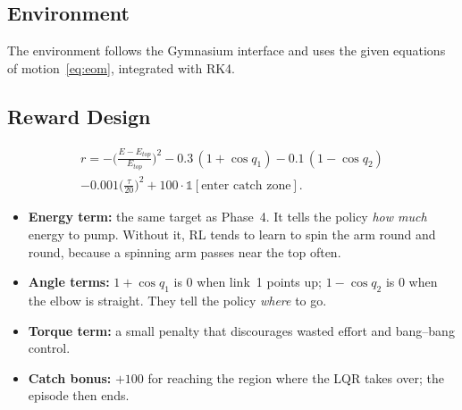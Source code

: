\subsection{Environment}
The environment follows the Gymnasium interface and uses the given equations of motion~\eqref{eq:eom}, integrated with RK4.
\begin{table}[H]
\centering
\caption{RL environment}
\label{tab:env}
\end{table}

\subsection{Reward Design}
\begin{multline}
r=-\Big(\frac{E-E_{top}}{E_{top}}\Big)^2-0.3\,(1+\cos q_1)-0.1\,(1-\cos q_2)\\
-0.001\Big(\frac{\tau}{20}\Big)^2+100\cdot\mathbb 1[\text{enter catch zone}] .
\end{multline}
\begin{itemize}
\item \textbf{Energy term:} the same target as Phase~4. It tells the policy \emph{how much} energy to pump. Without it, RL tends to learn to spin the arm round and round, because a spinning arm passes near the top often.
\item \textbf{Angle terms:} $1+\cos q_1$ is 0 when link~1 points up; $1-\cos q_2$ is 0 when the elbow is straight. They tell the policy \emph{where} to go.
\item \textbf{Torque term:} a small penalty that discourages wasted effort and bang--bang control.
\item \textbf{Catch bonus:} $+100$ for reaching the region where the LQR takes over; the episode then ends.
\end{itemize}

